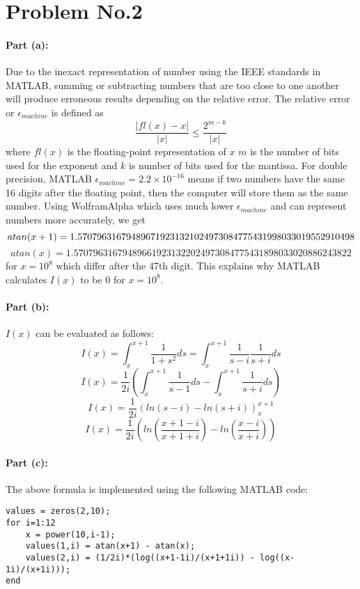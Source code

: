 \section*{Problem No.2} \label{sec:prob2}
\paragraph{Part (a):} 
Due to the inexact representation of number using the IEEE standards in MATLAB, summing or subtracting numbers that are too close to one another will produce erroneous results depending on the relative error. The relative error or $\epsilon_{machine}$ is defined as 
$$
\frac{|fl(x)-x|}{|x|} \leq \frac{2^{m-k}}{|x|}
$$
where $fl(x)$ is the floating-point representation of $x$ $m$ is the number of bits used for the exponent and $k$ is number of bits used for the mantissa. For double precision, MATLAB $\epsilon_{machine}=2.2\times10^{-16}$ means if two numbers have the same 16 digits after the floating point, then the computer will store them as the same number. Using WolframAlpha which uses much lower $\epsilon_{machine}$ and can represent numbers more accurately, we get
$$
atan(x+1) = 1.570796316794896719231321024973084775431998033019552910498\\
$$
$$
atan(x)=1.570796316794896619231322024973084775431898033020886243822
$$
for $x=10^8$ which differ after the 47th digit. This explains why MATLAB calculates $I(x)$ to be 0 for $x=10^8$.
 
\paragraph{Part (b):} 

$I(x)$ can be evaluated as follows:
\[
I(x) = \int_{x}^{x+1} \frac{1}{1+s^2} ds = \int_{x}^{x+1} \frac{1}{s-i} \frac{1}{s+i}ds
\]
$$
I(x) = \frac{1}{2i}  \left( \int_{x}^{x+1} \frac{1}{s-1} ds- \int_{x}^{x+1} \frac{1}{s+i} ds \right)
$$
$$
I(x) = \frac{1}{2i}  \left( ln(s-i) - ln(s+i) \right)_{x}^{x+1}
$$
$$
I(x) = \frac{1}{2i}  \left( ln\left(\frac{x+1-i}{x+1+i}\right) - ln\left(\frac{x-i}{x+i}\right)\right)
$$


\paragraph{Part (c):} The above formula is implemented using the following MATLAB code:

\begin{lstlisting}
values = zeros(2,10);
for i=1:12
    x = power(10,i-1);
    values(1,i) = atan(x+1) - atan(x);
    values(2,i) = (1/2i)*(log((x+1-1i)/(x+1+1i)) - log((x-1i)/(x+1i)));
end
\end{lstlisting}

